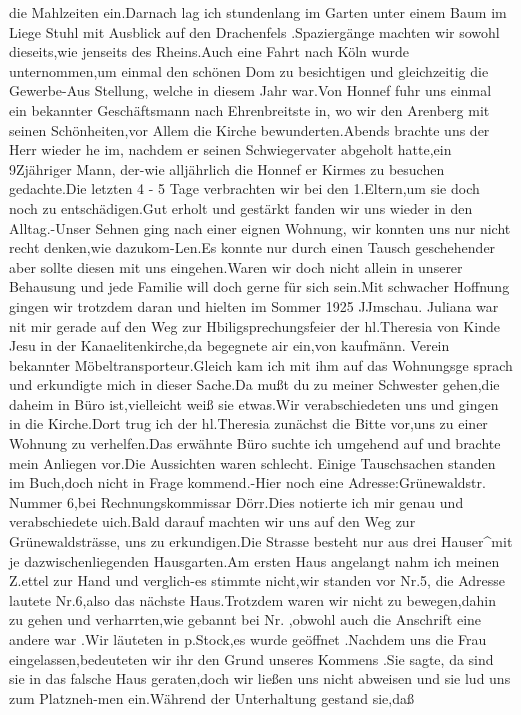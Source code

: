 \documentclass[a4paper,11pt]{article}
\begin{document}
die Mahlzeiten ein.Darnach lag ich stundenlang im Garten unter einem Baum im Liege Stuhl mit Ausblick auf den Drachenfels .Spaziergänge machten wir sowohl dieseits,wie jenseits des Rheins.Auch eine Fahrt nach Köln wurde unternommen,um einmal den schönen Dom zu besichtigen und gleichzeitig die Gewerbe-Aus Stellung, welche in diesem Jahr war.Von Honnef fuhr uns einmal ein bekannter Geschäftsmann nach Ehrenbreitste in, wo wir den Arenberg mit seinen Schönheiten,vor Allem die Kirche bewunderten.Abends brachte uns der Herr wieder he im, nachdem er seinen Schwiegervater abgeholt hatte,ein 9Zjähriger Mann, der-wie alljährlich die Honnef er Kirmes zu besuchen gedachte.Die letzten 4 - 5 Tage verbrachten wir bei den 1.Eltern,um sie doch noch zu entschädigen.Gut erholt und gestärkt fanden wir uns wieder in den Alltag.-Unser Sehnen ging nach einer eignen Wohnung, wir konnten uns nur nicht recht denken,wie dazukom-Len.Es konnte nur durch einen Tausch geschehender aber sollte diesen mit uns eingehen.Waren wir doch nicht allein in unserer Behausung und jede Familie will doch gerne für sich sein.Mit schwacher Hoffnung gingen wir trotzdem daran und hielten im Sommer 1925 JJmschau. Juliana war nit mir gerade auf den Weg zur Hbiligsprechungsfeier der hl.Theresia von Kinde Jesu in der Kanaelitenkirche,da begegnete air ein,von kaufmänn. Verein bekannter Möbeltransporteur.Gleich kam ich mit ihm auf das Wohnungsge sprach und erkundigte mich in dieser Sache.Da mußt du zu meiner Schwester gehen,die daheim in Büro ist,vielleicht weiß sie etwas.Wir verabschiedeten uns und gingen in die Kirche.Dort trug ich der hl.Theresia zunächst die Bitte vor,uns zu einer Wohnung zu verhelfen.Das erwähnte Büro suchte ich umgehend auf und brachte mein Anliegen vor.Die Aussichten waren schlecht. Einige Tauschsachen standen im Buch,doch nicht in Frage kommend.-Hier noch eine Adresse:Grünewaldstr. Nummer 6,bei Rechnungskommissar Dörr.Dies notierte ich mir genau und verabschiedete uich.Bald darauf machten wir uns auf den Weg zur Grünewaldsträsse, uns zu erkundigen.Die Strasse besteht nur aus drei Hauser^mit je dazwischenliegenden Hausgarten.Am ersten Haus angelangt nahm ich meinen Z.ettel zur Hand und verglich-es stimmte nicht,wir standen vor Nr.5, die Adresse lautete Nr.6,also das nächste Haus.Trotzdem waren wir nicht zu bewegen,dahin zu gehen und verharrten,wie gebannt bei Nr. ,obwohl auch die Anschrift eine andere war .Wir läuteten in p.Stock,es wurde geöffnet .Nachdem uns die Frau eingelassen,bedeuteten wir ihr den Grund unseres Kommens .Sie sagte, da sind sie in das falsche Haus geraten,doch wir ließen uns nicht abweisen und sie lud uns zum Platzneh-men ein.Während der Unterhaltung gestand sie,daß
\end{document}
